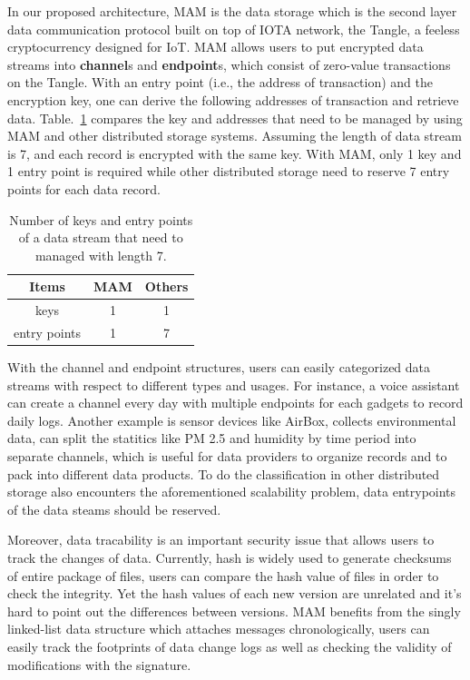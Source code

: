 \documentclass[conference]{IEEEtran}
\begin{document}
In our proposed architecture, MAM is the data storage which is the second layer data communication protocol built on top of IOTA\cite{IOTAwhitepaper} network, the Tangle, a feeless cryptocurrency designed for IoT. MAM allows users to put encrypted data streams into \textbf{channel}s and \textbf{endpoint}s, which consist of zero-value transactions on the Tangle. With an entry point (i.e., the address of transaction) and the encryption key, one can derive the following addresses of transaction and retrieve data. Table.~\ref{tab:mam_scalability} compares the key and addresses that need to be managed by using MAM and other distributed storage systems. Assuming the length of data stream is 7, and each record is encrypted with the same key. With MAM, only 1 key and 1 entry point is required while other distributed storage need to reserve 7 entry points for each data record.

\begin{table}[htbp]
	\caption{Number of keys and entry points of a data stream that need to managed with length 7.}
	\label{tab:mam_scalability}
	\begin{center}
	\begin{tabular}{|c|c|c|}
	\hline
		\textbf{Items} & \textbf{MAM} & \textbf{Others} \\ 
		\hline
		keys & 1 & 1 \\ 
		\hline
		entry points & 1 & 7 \\ 
		\hline
	\end{tabular}
	\end{center}
\end{table}

With the channel and endpoint structures, users can easily categorized data streams with respect to different types and usages. For instance, a voice assistant can create a channel every day with multiple endpoints for each gadgets to record daily logs. Another example is sensor devices like AirBox\cite{LASS}, collects environmental data, can split the statitics like PM 2.5 and humidity by time period into separate channels, which is useful for data providers to organize records and to pack into different data products. To do the classification in other distributed storage also encounters the aforementioned scalability problem, data entrypoints of the data steams should be reserved.    

Moreover, data tracability is an important security issue that allows users to track the changes of data. Currently, hash is widely used to generate checksums of entire package of files, users can compare the hash value of files in order to check the integrity. Yet the hash values of each new version are unrelated and it's hard to point out the differences between versions. MAM benefits from the singly linked-list data structure which attaches messages chronologically, users can easily track the footprints of data change logs as well as checking the validity of modifications with the signature.
\end{document}
